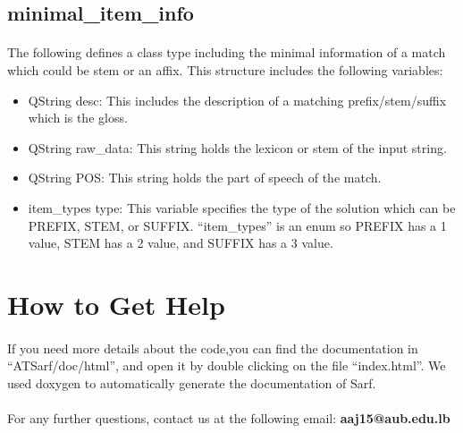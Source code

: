 \documentclass{article}
\begin{document}
\subsection{minimal\_item\_info}
\paragraph{}
The following defines a class type including the minimal information of a match which could be stem or an affix. This structure includes the following variables:
\begin{itemize}
\item QString desc: This includes the description of a matching prefix/stem/suffix which is the gloss.
\item QString raw\_data: This string holds the lexicon or stem of the input string.
\item QString POS: This string holds the part of speech of the match.
\item item\_types type: This variable specifies the type of the solution which can be PREFIX, STEM, or SUFFIX. ``item\_types'' is an enum so PREFIX has a 1 value, STEM has a 2 value, and SUFFIX has a 3 value.
\end{itemize}




\section{How to Get Help}
\paragraph{}
If you need more details about the code,you can find the documentation in ``ATSarf/doc/html'', and open it by double clicking on the file ``index.html''. We used doxygen to automatically generate the documentation of Sarf.

\paragraph{}
For any further questions, contact us at the following email: \textbf{aaj15@aub.edu.lb}
\end{document}
